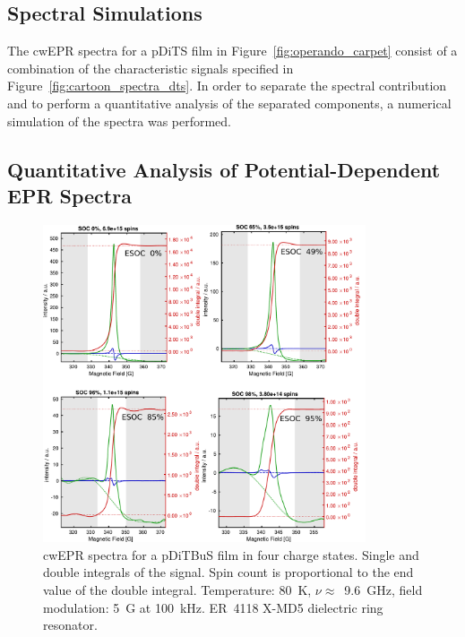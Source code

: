 \subsection{Spectral Simulations}
The cwEPR spectra for a pDiTS film in Figure~\ref{fig:operando_carpet} consist of a combination of the characteristic signals specified in Figure~\ref{fig:cartoon_spectra_dts}. In order to separate the spectral contribution and to perform a quantitative analysis of the separated components, a numerical simulation of the spectra was performed.


\subsection{Quantitative Analysis of Potential-Dependent EPR Spectra}
\label{sec:quantitative_EPR}
\begin{figure}[h]
\center
	\includegraphics[width=0.85\textwidth]{./pulse/figures/Figure_S6}
	\caption{cwEPR spectra for a pDiTBuS film in four charge states. Single and double integrals of the signal. Spin count is proportional to the end value of the double integral. Temperature: 80~K, $\nu\approx$~9.6~GHz, field modulation: 5~G at 100~kHz. ER~4118 X-MD5 dielectric ring resonator.}
	\label{fig:Figure_S6}
\end{figure}

